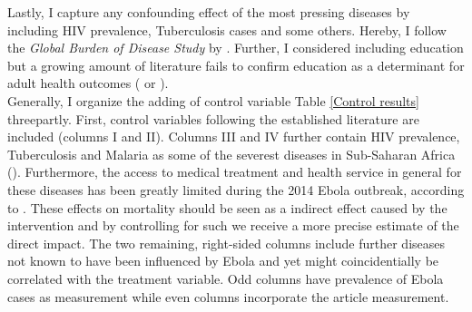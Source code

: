 \documentclass{article}
\begin{document}
Lastly, I capture any confounding effect of the most pressing diseases by including HIV prevalence, Tuberculosis cases and some others. Hereby, I follow the \textit{Global Burden of Disease Study} by \cite{lozano2012global}. Further, I considered including education but a growing amount of literature fails to confirm education as a determinant for adult health outcomes (\cite{clark2013effect} or \cite{meghir2018education}).\\
Generally, I organize the adding of control variable Table \ref{Control results} threepartly. First, control variables following the established literature are included (columns I and II). Columns III and IV further contain HIV prevalence, Tuberculosis and Malaria as some of the severest diseases in Sub-Saharan Africa (\cite{lozano2012global}). Furthermore, the access to medical treatment and health service in general for these diseases has been greatly limited during the 2014 Ebola outbreak, according to \cite{parpia2016effects}. These effects on mortality should be seen as a indirect effect caused by the intervention and by controlling for such we receive a more precise estimate of the direct impact. The two remaining, right-sided columns include further diseases not known to have been influenced by Ebola and yet might coincidentially be correlated with the treatment variable. Odd columns have prevalence of Ebola cases as measurement while even columns incorporate the article measurement.\\
\end{document}
